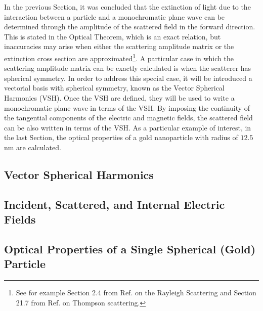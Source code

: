\documentclass[11pt]{Latex/Classes/PhDthesisPSnPDF}
\begin{document}
     In the previous Section, it was concluded that the extinction of light due to the interaction between a particle and a monochromatic plane wave can be determined through the amplitude of the scattered field in the forward direction. This is stated in the Optical Theorem, which is an exact relation, but inaccuracies may arise when either the scattering amplitude matrix or the extinction cross section are approximated\footnote{See for example Section 2.4 from Ref. \cite{tsang_scattering_2000} on the Rayleigh Scattering and Section 21.7 from Ref. \cite{zangwill_modern_2013} on Thompson scattering.}. A particular case in which the scattering amplitude matrix can be exactly calculated is when the scatterer has spherical symmetry. In order to address this special case, it will be introduced a vectorial basis with spherical symmetry, known as the Vector Spherical Harmonics (VSH). Once the VSH are defined, they will be used to write a monochromatic plane wave in terms of the VSH. By imposing the continuity of the tangential components of the electric and magnetic fields, the scattered field can be also written in terms of the VSH. As a particular example of interest, in the last Section, the optical properties of a gold nanoparticle with radius of $12.5$ nm are calculated.


	    \subsection{Vector Spherical Harmonics}
		 \label{ss:VSH}
		 

        \subsection{Incident, Scattered, and Internal Electric Fields}
	     \label{ss:Fields}
         

        \subsection{Optical Properties of a Single Spherical (Gold) Particle}
		 \label{ss:AuMie}
\end{document}
